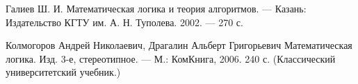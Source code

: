 \begin{thebibliography}{9}

Галиев Ш. И.
Математическая логика и теория алгоритмов.
--- Казань: Издательство КГТУ им. А. Н. Туполева.
2002. --- 270 с.

Колмогоров Андрей Николаевич, Драгалин Альберт Григорьевич
Математическая логика. Изд. 3-е, стереотипное. — М.: КомКнига, 2006.
240 с. (Классический университетский учебник.)

\end{thebibliography}

